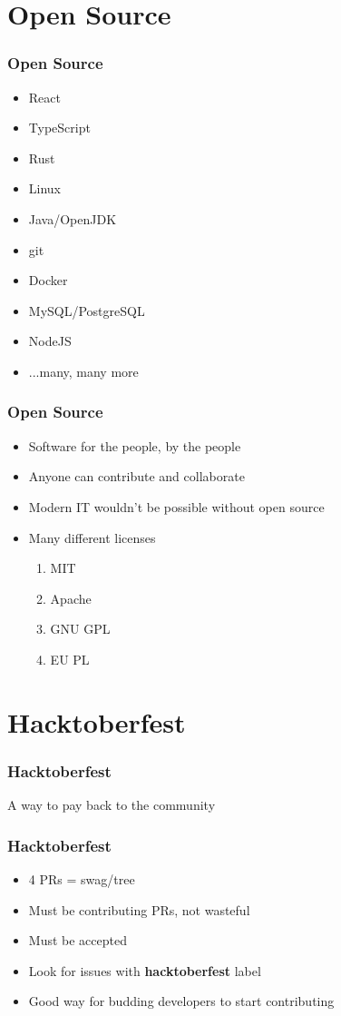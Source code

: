 \documentclass[presentation]{beamer}
\begin{document}
  \section{Open Source}
  \begin{frame}
    \frametitle{Open Source}
    \begin{itemize}
      \item React
      \item TypeScript
      \item Rust
      \item Linux
      \item Java/OpenJDK
      \item git
      \item Docker
      \item MySQL/PostgreSQL
      \item NodeJS
      \item ...many, many more
    \end{itemize}
  \end{frame}
  \begin{frame}
    \frametitle{Open Source}
 
    \begin{itemize}
      \item Software for the people, by the people
      \item Anyone can contribute and collaborate
      \item Modern IT wouldn't be possible without open source
      \item Many different licenses
      \begin{enumerate}
        \item MIT
        \item Apache
        \item GNU GPL
        \item EU PL
      \end{enumerate}
    \end{itemize}
  \end{frame}

  \section{Hacktoberfest}
  \begin{frame}[standout]
    \frametitle{Hacktoberfest}
  
    A way to pay back to the community
  \end{frame}
  \begin{frame}
    \frametitle{Hacktoberfest}
  
    \begin{itemize}
      \item 4 PRs = swag/tree
      \item Must be contributing PRs, not wasteful
      \item Must be accepted
      \item Look for issues with \textbf{hacktoberfest} label
      \item Good way for budding developers to start contributing
    \end{itemize}
  \end{frame}
\end{document}
